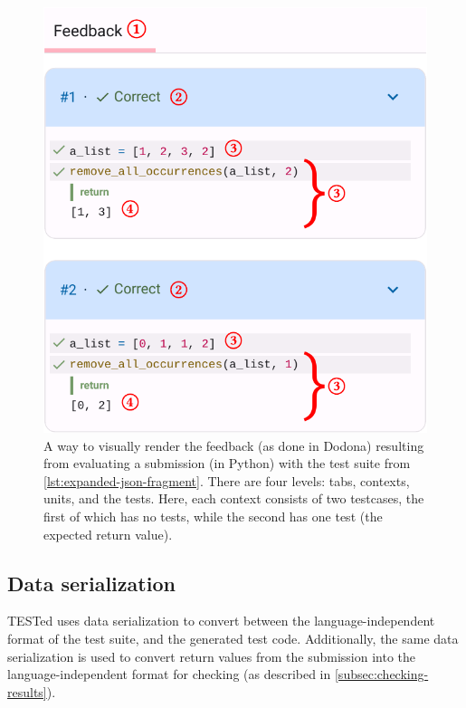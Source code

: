\documentclass[../main]{subfiles}
\begin{document}
\begin{figure}
    \centering
    \includegraphics[scale=0.4]{dodona-rendering}
    \caption{A way to visually render the feedback (as done in Dodona) resulting from evaluating a submission (in Python) with the test suite from \cref{lst:expanded-json-fragment}. There are four levels:  tabs,  contexts,  units, and  the tests. Here, each context consists of two testcases, the first of which has no tests, while the second has one test (the expected return value).}
    \label{fig:dodona}
\end{figure}

\subsection{Data serialization}\label{subsec:data-serialization}

TESTed uses data serialization to convert between the language-independent format of the test suite, and the generated test code.
Additionally, the same data serialization is used to convert return values from the submission into the language-independent format for checking (as described in \cref{subsec:checking-results}).
\end{document}
